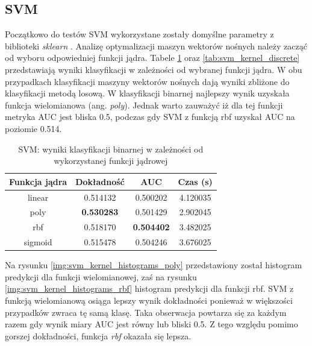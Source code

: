 \documentclass[a4paper, twoside, 11pt, openright]{article}
\begin{document}
\subsection{SVM}

Początkowo do testów SVM wykorzystane zostały domyślne parametry z biblioteki \textit{sklearn} \cite{bib:sklearnsvm}. Analizę optymalizacji maszyn wektorów nośnych należy zacząć od wyboru odpowiedniej funkcji jądra. Tabele \ref{tab:svm_kernel_binary} oraz \ref{tab:svm_kernel_discrete} przedstawiają wyniki klasyfikacji w zależności od wybranej funkcji jądra. W obu przypadkach klasyfikacji maszyny wektorów nośnych dają wyniki zbliżone do klasyfikacji metodą losową. W klasyfikacji binarnej najlepszy wynik uzyskała funkcja wielomianowa (ang. \textit{poly}). Jednak warto zauważyć iż dla tej funkcji metryka AUC jest bliska 0.5, podczas gdy SVM z funkcją rbf uzyskał AUC na poziomie 0.514.

\begin{table}[H]
    \centering
    \begin{tabular}{|c|c|c|c|}
    \hline
        \textbf{Funkcja jądra} & \textbf{Dokładność} & \textbf{AUC} & \textbf{Czas (s)} \\ \hline
linear  &  0.514132 &  0.500202 &    4.120035 \\ \hline
poly    &  \textbf{0.530283} &  0.501429 &    2.902045 \\ \hline
rbf     &  0.518170 &  \textbf{0.504402} &    3.482025 \\ \hline
sigmoid &  0.515478 &  0.504246 &    3.676025 \\ \hline
    \end{tabular}
    \caption{SVM: wyniki klasyfikacji binarnej w zależności od wykorzystanej funkcji jądrowej}
    \label{tab:svm_kernel_binary}
\end{table}

 Na rysunku \ref{img:svm_kernel_histograms_poly} przedstawiony został histogram predykcji dla funkcji wielomianowej, zaś na rysunku \ref{img:svm_kernel_histograms_rbf} histogram predykcji dla funkcji rbf. SVM z funkcją wielomianową osiąga lepszy wynik dokładności ponieważ w większości przypadków zwraca tę samą klasę. Taka obserwacja powtarza się za każdym razem gdy wynik miary AUC jest równy lub bliski 0.5. Z tego względu pomimo gorszej dokładności, funkcja \textit{rbf} okazała się lepsza.
\end{document}
